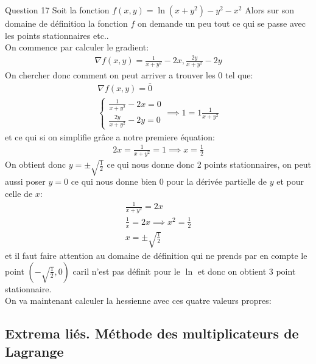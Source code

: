 \begin{parag}{Question 17}
   Soit la fonction $f\left(x, y\right) = \ln\left(x + y^2\right) - y^2 - x^2$ 
   Alors sur son domaine de définition la fonction $f$ on demande un peu tout ce qui se passe avec les points stationnaires etc..\\
   On commence par calculer le gradient:
   \begin{align*} 
        \nabla f\left(x, y\right) = \frac{1}{x + y^2} - 2x, \frac{2y}{x + y^2}- 2y
   \end{align*}
   On chercher donc comment on peut arriver a trouver les 0 tel que:
   \begin{align*} 
        \nabla f\left(x, y\right) =  \overline{0}\\
        \begin{cases}
            \frac{1}{x + y^2} -2x = 0\\
            \frac{2y}{x+y^2} - 2y = 0
        \end{cases} \implies 1 = 1\frac{1}{x + y^2}
   \end{align*}
   et ce qui si on simplifie grâce a notre premiere équation:
    \begin{align*} 
        2x = \frac{1}{x + y^2} = 1 \implies x = \frac{1}{2}
    \end{align*}
    On obtient donc $y = \pm \sqrt{\frac{1}{2}}$ ce qui nous donne donc 2 points stationnaires, on peut aussi poser $y = 0$ ce qui nous donne bien $0$ pour la dérivée partielle de $y$ et pour celle de $x$:
    \begin{align*} \frac{1}{x + y^2} = 2x\\
        \frac{1}{x} = 2x \implies x^2 = \frac{1}{2}\\
        x = \pm \sqrt{\frac{1}{2}}
    \end{align*}
    et il faut faire attention au domaine de définition qui ne prends par en compte le point $\left(-\sqrt{\frac{1}{2}}, 0\right)$ caril n'est pas définit pour le $\ln$ et donc on obtient $3$ point stationnaire.\\
    On va maintenant calculer la hessienne avec ces quatre valeurs  propres:
\end{parag}



\subsection{Extrema liés. Méthode des multiplicateurs de Lagrange}

